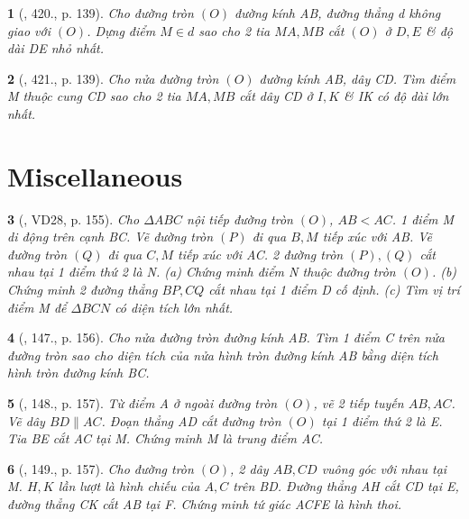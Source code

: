 \documentclass{article}
\newtheorem{baitoan}{}
\begin{document}
\begin{baitoan}[\cite{Binh_Toan_9_tap_2}, 420., p. 139]
	Cho đường tròn $(O)$ đường kính AB, đường thẳng d không giao với $(O)$. Dựng điểm $M\in d$ sao cho 2 tia $MA,MB$ cắt $(O)$ ở $D,E$ \& độ dài DE nhỏ nhất.
\end{baitoan}

\begin{baitoan}[\cite{Binh_Toan_9_tap_2}, 421., p. 139]
	Cho nửa đường tròn $(O)$ đường kính AB, dây CD. Tìm điểm M thuộc cung CD sao cho 2 tia $MA,MB$ cắt dây CD ở $I,K$ \& IK có độ dài lớn nhất.
\end{baitoan}


\section{Miscellaneous}

\begin{baitoan}[\cite{Tuyen_Toan_9_old}, VD28, p. 155]
	Cho $\Delta ABC$ nội tiếp đường tròn $(O)$, $AB < AC$. 1 điểm M di động trên cạnh BC. Vẽ đường tròn $(P)$ đi qua $B,M$ tiếp xúc với AB. Vẽ đường tròn $(Q)$ đi qua $C,M$ tiếp xúc với AC. 2 đường tròn $(P),(Q)$ cắt nhau tại 1 điểm thứ 2 là N. (a) Chứng minh điểm N thuộc đường tròn $(O)$. (b) Chứng minh 2 đường thẳng $BP,CQ$ cắt nhau tại 1 điểm D cố định. (c) Tìm vị trí điểm M để $\Delta BCN$ có diện tích lớn nhất.
\end{baitoan}

\begin{baitoan}[\cite{Tuyen_Toan_9_old}, 147., p. 156]
	Cho nửa đường tròn đường kính AB. Tìm 1 điểm C trên nửa đường tròn sao cho diện tích của nửa hình tròn đường kính AB bằng diện tích hình tròn đường kính BC.
\end{baitoan}

\begin{baitoan}[\cite{Tuyen_Toan_9_old}, 148., p. 157]
	Từ điểm A ở ngoài đường tròn $(O)$, vẽ 2 tiếp tuyến $AB,AC$. Vẽ dây $BD\parallel AC$. Đoạn thẳng AD cắt đường tròn $(O)$ tại 1 điểm thứ 2 là E. Tia BE cắt AC tại M. Chứng minh M là trung điểm AC.
\end{baitoan}

\begin{baitoan}[\cite{Tuyen_Toan_9_old}, 149., p. 157]
	Cho đường tròn $(O)$, 2 dây $AB,CD$ vuông góc với nhau tại M. $H,K$ lần lượt là hình chiếu của $A,C$ trên BD. Đường thẳng AH cắt CD tại E, đường thẳng CK cắt AB tại F. Chứng minh tứ giác ACFE là hình thoi.
\end{baitoan}
\end{document}
